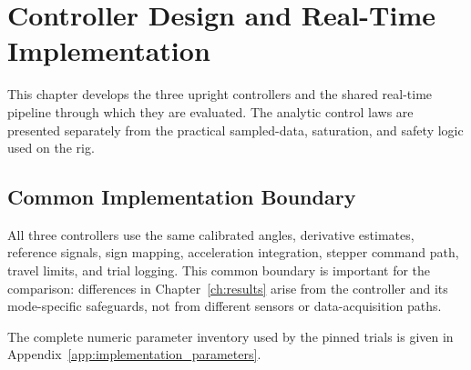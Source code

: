 \chapter{Controller Design and Real-Time Implementation}
\label{ch:controller_implementation}

This chapter develops the three upright controllers and the shared real-time
pipeline through which they are evaluated. The analytic control laws are
presented separately from the practical sampled-data, saturation, and safety
logic used on the rig.







\section{Common Implementation Boundary}
All three controllers use the same calibrated angles, derivative estimates,
reference signals, sign mapping, acceleration integration, stepper command
path, travel limits, and trial logging. This common boundary is important for
the comparison: differences in Chapter~\ref{ch:results} arise from the
controller and its mode-specific safeguards, not from different sensors or
data-acquisition paths.

The complete numeric parameter inventory used by the pinned trials is given in
Appendix~\ref{app:implementation_parameters}.
